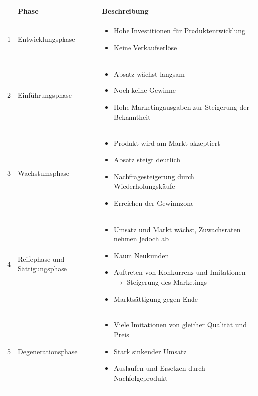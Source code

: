 \documentclass[titlepage,parskip=half]{scrartcl}
\begin{document}
\begin{tabularx}{\textwidth}{|r|l|X|} \hline
    & Phase & Beschreibung \\ \hline
    1 & Entwicklungsphase & 
    \begin{itemize}[noitemsep]
        \item Hohe Investitionen für Produktentwicklung
        \item Keine Verkaufserlöse
    \end{itemize} \\ \hline
    2 & Einführungsphase & 
    \begin{itemize}[noitemsep]
        \item Absatz wächst langsam
        \item Noch keine Gewinne
        \item Hohe Marketingausgaben zur Steigerung der Bekanntheit
    \end{itemize} \\ \hline
    3 & Wachstumsphase & 
    \begin{itemize}[noitemsep]
        \item Produkt wird am Markt akzeptiert
        \item Absatz steigt deutlich
        \item Nachfragesteigerung durch Wiederholungskäufe
        \item Erreichen der Gewinnzone
    \end{itemize} \\ \hline
    4 & Reifephase und Sättigungsphase & 
    \begin{itemize}[noitemsep]
        \item Umsatz und Markt wächst, Zuwachsraten nehmen jedoch ab
        \item Kaum Neukunden
        \item Auftreten von Konkurrenz und Imitationen $\rightarrow$ Steigerung des Marketings
        \item Marktsättigung gegen Ende
    \end{itemize} \\ \hline
    5 & Degenerationsphase & 
    \begin{itemize}[noitemsep]
        \item Viele Imitationen von gleicher Qualität und Preis
        \item Stark sinkender Umsatz
        \item Auslaufen und Ersetzen durch Nachfolgeprodukt
    \end{itemize} \\ \hline
\end{tabularx}
\end{document}
